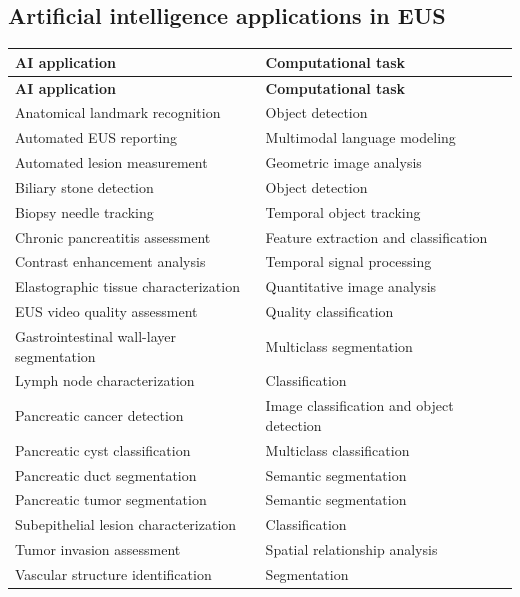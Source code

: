 \subsection{Artificial intelligence applications in EUS}
\begin{longtable}{@{}p{}p{}@{}}
\toprule
\textbf{AI application} & \textbf{Computational task} \\
\midrule
\endfirsthead
\toprule
\textbf{AI application} & \textbf{Computational task} \\
\midrule
\endhead
Anatomical landmark recognition & Object detection \\
Automated EUS reporting & Multimodal language modeling \\
Automated lesion measurement & Geometric image analysis \\
Biliary stone detection & Object detection \\
Biopsy needle tracking & Temporal object tracking \\
Chronic pancreatitis assessment & Feature extraction and classification \\
Contrast enhancement analysis & Temporal signal processing \\
Elastographic tissue characterization & Quantitative image analysis \\
EUS video quality assessment & Quality classification \\
Gastrointestinal wall-layer segmentation & Multiclass segmentation \\
Lymph node characterization & Classification \\
Pancreatic cancer detection & Image classification and object detection \\
Pancreatic cyst classification & Multiclass classification \\
Pancreatic duct segmentation & Semantic segmentation \\
Pancreatic tumor segmentation & Semantic segmentation \\
Subepithelial lesion characterization & Classification \\
Tumor invasion assessment & Spatial relationship analysis \\
Vascular structure identification & Segmentation \\
\bottomrule
\end{longtable}

